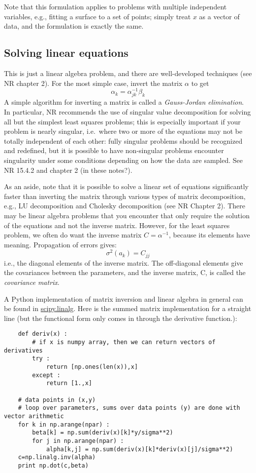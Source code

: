 \documentclass[12pt]{article}
\begin{document}
Note that this formulation applies to problems with multiple
independent variables, e.g., fitting a surface to a set of points;
simply treat $x$ as a vector of data, and the formulation is exactly
the same.

\subsection{Solving linear equations}

This is just a linear algebra problem, and there are well-developed
techniques (see NR chapter 2). For the most simple case, invert the matrix $\alpha$
to get
$$ \alpha_k = \alpha_{jk}^{-1}\beta_k $$
A simple algorithm for inverting a matrix is called a
\emph{Gauss-Jordan elimination}. In particular, NR recommends
the use of singular value decomposition for solving all but the
simplest least squares problems; this is especially important if
your problem is nearly singular, i.e.\ where two or more of the
equations may not be totally independent of each other:
fully singular problems should be recognized and redefined,
but it is possible to have non-singular problems encounter
singularity under some conditions depending on how the data are
sampled. See NR 15.4.2 and chapter 2 (in these notes?).

As an aside, note that it is possible to solve a linear set of equations
significantly faster than inverting the matrix through various types of
matrix decomposition, e.g., LU decomposition and Cholesky decomposition
(see NR Chapter 2). There may be linear algebra problems that you
encounter that only require the solution of the equations and not the
inverse matrix. However, for the least squares problem, we often
do want the inverse matrix $C = \alpha^{-1}$, because its elements
have meaning. Propagation of errors gives:
$$ \sigma^{2}(a_{k}) = C_{jj}  $$
i.e., the diagonal elements of the inverse matrix. The off-diagonal
elements give the covariances between the parameters, and the inverse
matrix, C, is called the \emph{covariance matrix}.

A Python implementation of matrix inversion and linear algebra in general
can be found in
\href{http://docs.scipy.org/doc/scipy/reference/tutorial/linalg.html}{scipy.linalg}.
Here is the summed matrix implementation for a straight line
(but the functional form only comes in through the derivative function.):
\begin{verbatim}
    def deriv(x) :
        # if x is numpy array, then we can return vectors of derivatives
        try :
            return [np.ones(len(x)),x]
        except :
            return [1.,x]

    # data points in (x,y)
    # loop over parameters, sums over data points (y) are done with vector arithmetic
    for k in np.arange(npar) :
        beta[k] = np.sum(deriv(x)[k]*y/sigma**2)
        for j in np.arange(npar) :
            alpha[k,j] = np.sum(deriv(x)[k]*deriv(x)[j]/sigma**2)
    c=np.linalg.inv(alpha)
    print np.dot(c,beta)
\end{verbatim}
\end{document}
